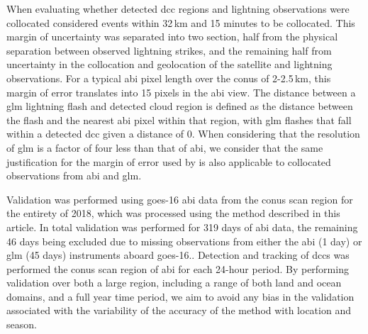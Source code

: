 When evaluating whether detected \acrshort{dcc} regions and lightning observations were collocated \citet{muller_novel_2019} considered events within 32\,\unit{km} and 15 minutes to be collocated.
This margin of uncertainty was separated into two section, half from the physical separation between observed lightning strikes, and the remaining half from uncertainty in the collocation and geolocation of the satellite and lightning observations.
For a typical \acrshort{abi} pixel length over the \acrshort{conus} of 2-2.5\,\unit{km}, this margin of error translates into 15 pixels in the \acrshort{abi} view.
The distance between a \acrshort{glm} lightning flash and detected cloud region is defined as the distance between the flash and the nearest \acrshort{abi} pixel within that region, with \acrshort{glm} flashes that fall within a detected \acrshort{dcc} given a distance of 0.
When considering that the resolution of \acrshort{glm} is a factor of four less than that of \acrshort{abi}, we consider that the same justification for the margin of error used by \citet{muller_novel_2019} is also applicable to collocated observations from \acrshort{abi} and \acrshort{glm}.

Validation was performed using \acrshort{goes}-16 \acrshort{abi} data from the \acrshort{conus} scan region for the entirety of 2018, which was processed using the method described in this article.
In total validation was performed for 319 days of \acrshort{abi} data, the remaining 46 days being excluded due to missing observations from either the \acrshort{abi} (1 day) or \acrshort{glm} (45 days) instruments aboard \acrshort{goes}-16..
Detection and tracking of \acrshort{dcc}s was performed the \acrshort{conus} scan region of \acrshort{abi} for each 24-hour period. 
By performing validation over both a large region, including a range of both land and ocean domains, and a full year time period, we aim to avoid any bias in the validation associated with the variability of the accuracy of the method with location and season.

